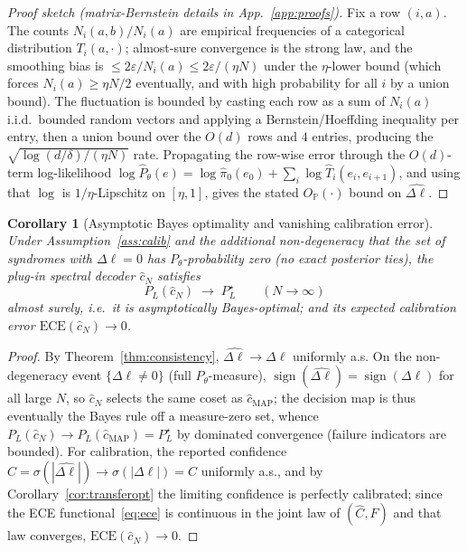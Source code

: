 \documentclass[reprint,aps,prxquantum,amsmath,amssymb,floatfix,nofootinbib,longbibliography]{revtex4-2}
\newtheorem{corollary}{Corollary}
\theoremstyle{definition}
\theoremstyle{remark}
\theoremstyle{plain}
\newcommand{\PP}{\mathbb{P}}
\newcommand{\eps}{\varepsilon}
\newcommand{\abs}[1]{\left\lvert #1 \right\rvert}
\begin{document}
\begin{proof}[Proof sketch (matrix-Bernstein details in App.~\ref{app:proofs})]
Fix a row $(i,a)$. The counts $N_i(a,b)/N_i(a)$ are empirical frequencies of a
categorical distribution $T_i(a,\cdot)$; almost-sure convergence is the strong
law, and the smoothing bias is $\le2\eps/N_i(a)\le2\eps/(\eta N)$ under the
$\eta$-lower bound (which forces $N_i(a)\ge\eta N/2$ eventually, and with high
probability for all $i$ by a union bound). The fluctuation is bounded by
casting each row as a sum of $N_i(a)$ i.i.d.\ bounded random vectors and
applying a Bernstein/Hoeffding inequality per entry, then a union bound over
the $O(d)$ rows and $4$ entries, producing the $\sqrt{\log(d/\delta)/(\eta N)}$
rate. Propagating the row-wise error through the $O(d)$-term log-likelihood
$\log\hat P_\theta(e)=\log\hat\pi_0(e_0)+\sum_i\log\hat T_i(e_i,e_{i+1})$, and
using that $\log$ is $1/\eta$-Lipschitz on $[\eta,1]$, gives the stated
$O_\PP(\cdot)$ bound on $\hat{\Delta\ell}$.
\end{proof}

\begin{corollary}[Asymptotic Bayes optimality and vanishing calibration error]
\label{cor:asympopt}
Under Assumption~\ref{ass:calib} and the additional non-degeneracy that the set
of syndromes with $\Delta\ell=0$ has $P_\theta$-probability zero (no exact
posterior ties), the plug-in spectral decoder $\hat c_N$ satisfies
\begin{equation}
  P_L(\hat c_N)\;\longrightarrow\;P_L^\star \qquad(N\to\infty)
  \label{eq:asympbayes}
\end{equation}
almost surely, i.e.\ it is asymptotically Bayes-optimal; and its expected
calibration error $\mathrm{ECE}(\hat c_N)\to0$.
\end{corollary}

\begin{proof}
By Theorem~\ref{thm:consistency}, $\hat{\Delta\ell}\to\Delta\ell$ uniformly a.s.
On the non-degeneracy event $\{\Delta\ell\neq0\}$ (full $P_\theta$-measure),
$\operatorname{sign}(\hat{\Delta\ell})=\operatorname{sign}(\Delta\ell)$ for all
large $N$, so $\hat c_N$ selects the same coset as $\hat c_{\mathrm{MAP}}$; the
decision map is thus eventually the Bayes rule off a measure-zero set, whence
$P_L(\hat c_N)\to P_L(\hat c_{\mathrm{MAP}})=P_L^\star$ by dominated
convergence (failure indicators are bounded). For calibration, the reported
confidence $\hat C=\sigma(\abs{\hat{\Delta\ell}})\to\sigma(\abs{\Delta\ell})=C$
uniformly a.s., and by Corollary~\ref{cor:transferopt} the limiting confidence
is perfectly calibrated; since the ECE functional~\eqref{eq:ece} is continuous
in the joint law of $(\hat C,F)$ and that law converges, $\mathrm{ECE}(\hat
c_N)\to0$.
\end{proof}
\end{document}
